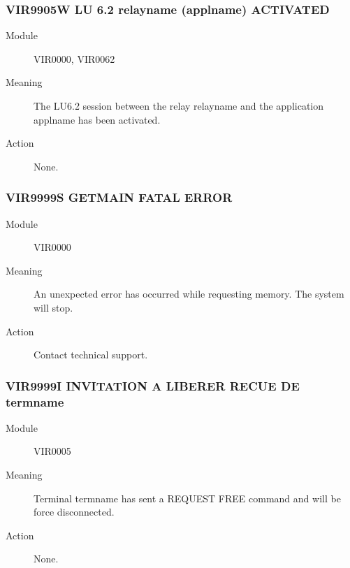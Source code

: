 \documentclass[letterpaper,10pt,english]{sphinxmanual}
\begin{document}
\subsubsection{VIR9905W LU 6.2 relayname (applname) ACTIVATED}
\label{\detokenize{messages:vir9905w-lu-6-2-relayname-applname-activated}}\begin{description}
\item[{Module}] \leavevmode
VIR0000, VIR0062

\item[{Meaning}] \leavevmode
The LU6.2 session between the relay relayname and the application applname has been activated.

\item[{Action}] \leavevmode
None.

\end{description}


\subsubsection{VIR9999S GETMAIN FATAL ERROR}
\label{\detokenize{messages:vir9999s-getmain-fatal-error}}\begin{description}
\item[{Module}] \leavevmode
VIR0000

\item[{Meaning}] \leavevmode
An unexpected error has occurred while requesting memory. The system will stop.

\item[{Action}] \leavevmode
Contact technical support.

\end{description}


\subsubsection{VIR9999I INVITATION A LIBERER RECUE DE termname}
\label{\detokenize{messages:vir9999i-invitation-a-liberer-recue-de-termname}}\begin{description}
\item[{Module}] \leavevmode
VIR0005

\item[{Meaning}] \leavevmode
Terminal termname has sent a REQUEST FREE command and will be force disconnected.

\item[{Action}] \leavevmode
None.

\end{description}
\end{document}
